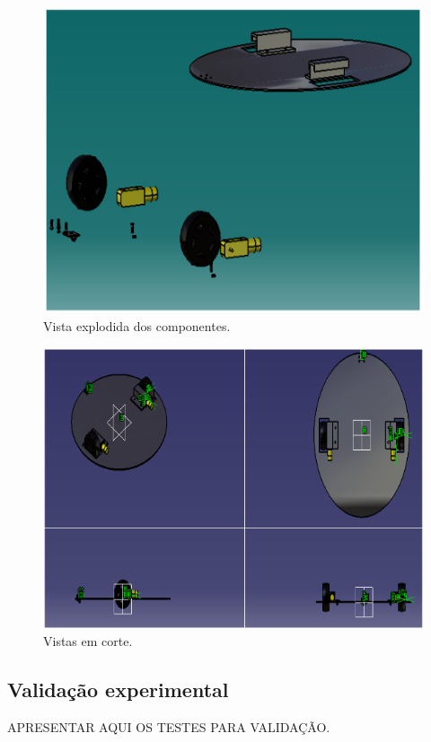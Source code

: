 \begin{figure}[H]
	\centering
	\includegraphics[scale=0.3]{figuras/vista_explodida.png}
	\caption{Vista explodida dos componentes.}
	\label{img:vista_explodida}
\end{figure}

\begin{figure}[H]
	\centering
	\includegraphics[scale=0.3]{figuras/vistas_em_corte.png}
	\caption{Vistas em corte.}
	\label{img:vistas_em_corte}
\end{figure}

\subsection{Validação experimental} %
	\label{sub:validação_experimental}

	APRESENTAR AQUI OS TESTES PARA VALIDAÇÃO.